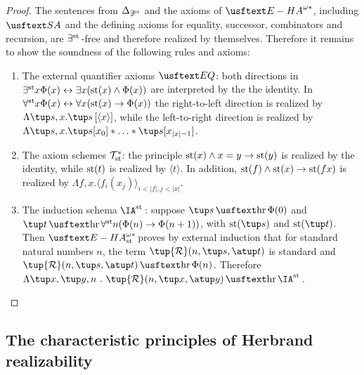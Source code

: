 \begin{proof}
The sentences from $\Delta_{\not\exists^{\operatorname{st}}}$ and the axioms of $\ehastar$, including $\SA$ and the defining axioms for equality, successor, combinators and recursion, are $\exists^{\operatorname{st}{}}$-free and therefore realized by themselves. Therefore it remains to show the soundness of the following rules and axioms:
\begin{enumerate}
\item The external quantifier axioms $\EQ$: both directions in $\exists^{\operatorname{st}{}}\! x \Phi(x) \leftrightarrow  \exists x (\operatorname{st}(x)\wedge\Phi(x))$ are interpreted by the the identity. In $\forall^{\operatorname{st}{}}\! x \Phi(x) \leftrightarrow   \forall x (\operatorname{st}(x)\rightarrow\Phi(x))$ the right-to-left direction is realized by $\Lambda \tup s, x. \tup s \, [\langle x \rangle]$, while the left-to-right direction is realized by $\Lambda \tup s, x. \tup s[x_0] * \ldots * \tup s[x_{|x|-1}]$.
\item The axiom schemes $\mathcal{T}^*_{\operatorname{st}{}}\!$: the principle $\operatorname{st}(x) \land x = y \to \operatorname{st}(y)$ is realized by the identity, while $\operatorname{st}(t)$ is realized by $\langle t \rangle$. In addition, $\operatorname{st}(f) \land \operatorname{st}(x) \to \operatorname{st}(fx)$ is realized by $\Lambda f, x. \langle f_i(x_j) \rangle_{i < |f|, j < |x|}$. 
\item The induction schema $\IA^{\st{}}$:
suppose $\tup s \hr \Phi(0)$ and $\tup t \hr \forallst n (\Phi(n)\rightarrow\Phi(n+1))$, with $\st(\tup s)$ and $\st(\tup t)$. Then $\ehaststar$ proves by external induction that for standard natural numbers $n$, the term $\tup {\mathcal R} (n,\tup s,\atup t)$ is standard and $\tup {\mathcal R} (n,\tup s,\atup t) \hr \Phi(n)$. Therefore $\Lambda \tup x,\tup y, n\ .\ \tup {\mathcal R} (n,\tup x,\atup y) \hr \IA^{\st{}}$.
\end{enumerate}
\end{proof}

\subsection{The characteristic principles of Herbrand realizability}

